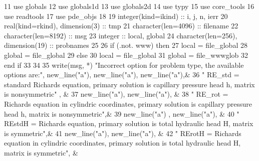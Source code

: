\begin{DoxyCode}
11       \textcolor{keywordtype}{use }globals
12       \textcolor{keywordtype}{use }globals1d
13       \textcolor{keywordtype}{use }globals2d
14       \textcolor{keywordtype}{use }typy
15       \textcolor{keywordtype}{use }core_tools
16       \textcolor{keywordtype}{use }readtools
17       \textcolor{keywordtype}{use }pde_objs
18 
19       \textcolor{keywordtype}{integer(kind=ikind)} :: i, j, n, ierr
20       \textcolor{keywordtype}{real(kind=rkind)}, \textcolor{keywordtype}{dimension(3)} :: tmp
21       \textcolor{keywordtype}{character(len=4096)} :: filename
22       \textcolor{keywordtype}{character(len=8192)} :: msg
23       \textcolor{keywordtype}{integer} :: local, global
24       \textcolor{keywordtype}{character(len=256)}, \textcolor{keywordtype}{dimension(19)} :: probnames
25       
26       \textcolor{keywordflow}{if} (.not. www) \textcolor{keywordflow}{then}
27         local = file_global
28         global = file_global
29       \textcolor{keywordflow}{else}
30         local = file_global
31         global = file_wwwglob
32 \textcolor{keywordflow}{      end if}
33 
34       
35       \textcolor{keyword}{write}(msg, *) \textcolor{stringliteral}{"Incorrect option for problem type, the available options are:"}\textcolor{comment}{, new\_line(}\textcolor{stringliteral}{"a"}\textcolor{comment}{),  
      new\_line(}\textcolor{stringliteral}{"a"}\textcolor{comment}{), new\_line(}\textcolor{stringliteral}{"a"}\textcolor{comment}{),&}
36 \textcolor{comment}{        }\textcolor{stringliteral}{"   RE\_std = standard Richards equation, primary solution is capillary pressure head h, matrix is
       nonsymmetric"}\textcolor{comment}{ , &}
37 \textcolor{comment}{         new\_line(}\textcolor{stringliteral}{"a"}), new\_line(\textcolor{stringliteral}{"a"}),  &
38         \textcolor{stringliteral}{"   RE\_rot = Richards equation in cylindric coordinates, primary solution is capillary pressure
       head h, matrix is nonsymmetric"}\textcolor{comment}{,& }
39 \textcolor{comment}{        new\_line(}\textcolor{stringliteral}{"a"}) ,  new\_line(\textcolor{stringliteral}{"a"}), &
40         \textcolor{stringliteral}{"   REstdH = Richards equation, primary solution is total hydraulic head H, matrix is symmetric"}\textcolor{comment}{,&}
41 \textcolor{comment}{        new\_line(}\textcolor{stringliteral}{"a"}), new\_line(\textcolor{stringliteral}{"a"}),  &
42         \textcolor{stringliteral}{"   RErotH =  Richards equation in cylindric coordinates,  primary solution is total hydraulic head
       H, matrix is symmetric"}\textcolor{comment}{, &}

\end{DoxyCode}
